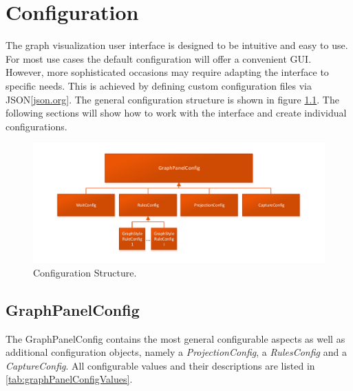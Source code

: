 \chapter{Configuration}
The graph visualization user interface is designed to be intuitive and easy to use. For most use cases the default configuration will offer a convenient GUI. However, more sophisticated occasions may require adapting the interface to specific needs. This is achieved by defining custom configuration files via JSON[\href{http://www.json.org}{json.org}]. The general configuration structure is shown in figure \ref{fig:configstruct}. The following sections will show how to work with the interface and create individual configurations.

\begin{figure} [h]
\centering
\includegraphics [scale=0.85] {images/configstruct.pdf}
\caption{Configuration Structure.}
\label{fig:configstruct}
\end{figure}


\section{GraphPanelConfig}
The GraphPanelConfig contains the most general configurable aspects as well as additional configuration objects, namely a \emph{ProjectionConfig}, a \emph{RulesConfig} and a \emph{CaptureConfig}. All configurable values and their descriptions are listed in \ref{tab:graphPanelConfigValues}.

